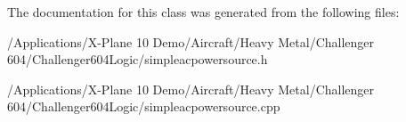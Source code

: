 The documentation for this class was generated from the following files\-:\begin{DoxyCompactItemize}
\item 
/\-Applications/\-X-\/\-Plane 10 Demo/\-Aircraft/\-Heavy Metal/\-Challenger 604/\-Challenger604\-Logic/simpleacpowersource.\-h\item 
/\-Applications/\-X-\/\-Plane 10 Demo/\-Aircraft/\-Heavy Metal/\-Challenger 604/\-Challenger604\-Logic/simpleacpowersource.\-cpp\end{DoxyCompactItemize}
